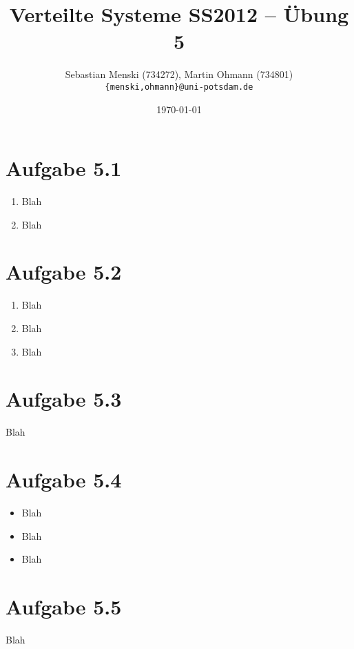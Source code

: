 \documentclass[german,12pt,a4paper]{article}
\begin{document}
\title{\textbf{Verteilte Systeme SS2012 -- Übung 5}}
\author{Sebastian Menski (734272), Martin Ohmann (734801) \\ \texttt{\{menski,ohmann\}@uni-potsdam.de}}
\date{\today}

\maketitle

\section*{Aufgabe 5.1}

\begin{enumerate}

	\item Blah

	\item Blah

\end{enumerate}

\section*{Aufgabe 5.2}

\begin{enumerate}

	\item Blah
	
	\item Blah
	
	\item Blah

\end{enumerate}

\section*{Aufgabe 5.3}

Blah

\section*{Aufgabe 5.4}

\begin{itemize}

	\item Blah

	\item Blah
	
	\item Blah

\end{itemize}

\section*{Aufgabe 5.5}

Blah
\end{document}
